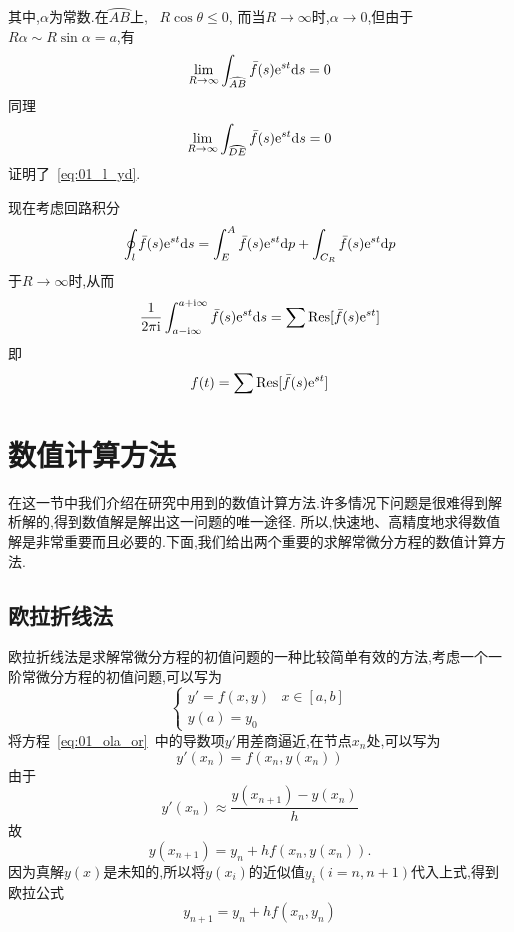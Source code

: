 其中,$\alpha$为常数.在$\wideparen{AB}$上,
~$R\cos\theta\leq0$,
而当$R\to\infty$时,$\alpha\to0$,但由于$R\alpha\sim
R\sin\alpha=a$,有
\begin{equation*}
\lim_{R\to\infty}\int_{\wideparen{AB}}\bar{f}(s)\me^{st}\dif s=0
\end{equation*}
同理
\begin{equation*}
\lim_{R\to\infty}\int_{\wideparen{DE}}\bar{f}(s)\me^{st}\dif s=0
\end{equation*}
证明了~\ref{eq:01_l_yd}.\par
现在考虑回路积分
\begin{equation*}
\oint_l\bar{f}(s)\mathrm{e}^{st}\mathrm{d} s=\int_E^A\bar{f}(s)\mathrm{e}^{st}\mathrm{d} p+\int_{C_R}\bar{f}(s)\mathrm{e}^{st}\mathrm{d} p
\end{equation*}
于$R\to\infty$时,从而
\begin{equation*}
 \dfrac{1}{2\pi\mathrm{i}}\int_{a-\mathrm{i}\infty}^{a+\mathrm{i}\infty}\bar{f}(s)\mathrm{e}^{st}\mathrm{d} s=
 \sum\mathrm{Res}[\bar{f}(s)\mathrm{e}^{st}]
\end{equation*}
即
\begin{equation}
 f(t)=\sum\mathrm{Res}[\bar{f}(s)\mathrm{e}^{st}]
\end{equation}
\section{数值计算方法}
在这一节中我们介绍在研究中用到的数值计算方法.许多情况下问题是很难得到解析解的,得到数值解是解出这一问题的唯一途径.
所以,快速地、高精度地求得数值解是非常重要而且必要的.下面,我们给出两个重要的求解常微分方程的数值计算方法.
\subsection{欧拉折线法}
欧拉折线法是求解常微分方程的初值问题的一种比较简单有效的方法,考虑一个一阶常微分方程的初值问题,可以写为
\begin{equation}\label{eq:01_ola_or}
 \begin{cases}
  y'=f(x,y)	&	x\in[a,b]	\\
  y(a)=y_0
 \end{cases}
\end{equation}
将方程~\ref{eq:01_ola_or}~中的导数项$y'$用差商逼近,在节点$x_n$处,可以写为
\begin{equation}
 y'(x_n)=f(x_n,y(x_n))
\end{equation}
由于
\begin{equation*}
 y'(x_n)\approx\dfrac{y(x_{n+1})-y(x_n)}{h}
\end{equation*}
故
\begin{equation}
 y(x_{n+1})=y_n+hf(x_n,y(x_n)).
\end{equation}
因为真解$y(x)$是未知的,所以将$y(x_i)$的近似值$y_i(i=n,n+1)$代入上式,得到欧拉公式
\begin{equation}
 y_{n+1}=y_n+hf(x_n,y_n)
\end{equation}
